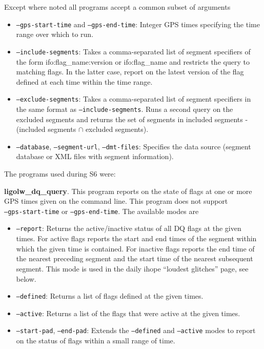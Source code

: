 Except where noted all programs accept a common subset of arguments
\begin{itemize}
\item \texttt{--gps-start-time} and \texttt{--gps-end-time}: Integer
GPS times specifying the time range over which to run.
\item \texttt{--include-segments}: Takes a comma-separated list of
segment specifiers of the form ifo:flag\_name:version or
ifo:flag\_name and restricts the query to matching flags.  In the
latter case, report on the latest version of the flag defined at each
time within the time range.
\item \texttt{--exclude-segments}: Takes a comma-separated list of
segment specifiers in the same format as \texttt{--include-segments}.
Runs a second query on the excluded segments and returns the set of
segments in included segments - (included segments $\cap$ excluded
segments).
\item \texttt{--database}, \texttt{--segment-url},
\texttt{--dmt-files}: Specifies the data source (segment database or
XML files with segment information).
\end{itemize}


The programs used during S6 were:

\textbf{ligolw\_dq\_query}.  This program reports on the state of
flags at one or more GPS times given on the command line.  This
program does not support \\
\texttt{--gps-start-time} or \texttt{--gps-end-time}.   The available modes are

\begin{itemize}
\item \texttt{--report}:  Returns the active/inactive status of all DQ flags at the
given times.  For active flags reports the start and end times of the
segment within which the given time is contained.  For inactive flags
reports the end time of the nearest preceding segment and the start
time of the nearest subsequent segment.  This mode is used in the
daily ihope ``loudest glitches'' page, see below.
\item \texttt{--defined}: Returns a list of flags defined at the
given times.
\item \texttt{--active}: Returns a list of the flags that were active
at the given times.
\item \texttt{--start-pad}, \texttt{--end-pad}: Extends the
\texttt{--defined} and \texttt{--active} modes to report on the status
of flags within a small range of time.
\end{itemize}


